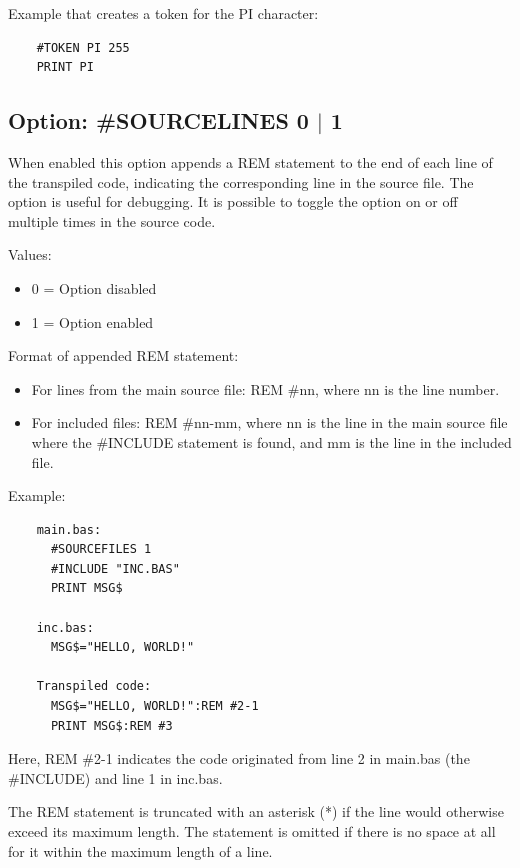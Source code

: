 \documentclass{article}
\begin{document}
        Example that creates a token for the PI character:

        \begin{verbatim}
    #TOKEN PI 255
    PRINT PI
         \end{verbatim}

    \subsection{Option: \#SOURCELINES 0 $|$ 1}
        When enabled this option appends a REM statement to the end of each line of the
        transpiled code, indicating the corresponding line in the source file. 
        The option is useful for debugging. It is possible to toggle the option on or off multiple times 
        in the source code.

        Values:
        \begin{itemize}
            \item 0 = Option disabled
            \item 1 = Option enabled
        \end{itemize}

        Format of appended REM statement:
        \begin{itemize}
            \item For lines from the main source file: REM \#nn, where nn is the line number.
            \item For included files: REM \#nn-mm, where nn is the line in the main source file
            where the \#INCLUDE statement is found, and mm is the line in the included file.
        \end{itemize}

        Example:
        \begin{verbatim}
    main.bas:
      #SOURCEFILES 1
      #INCLUDE "INC.BAS"
      PRINT MSG$

    inc.bas:
      MSG$="HELLO, WORLD!"
    
    Transpiled code:
      MSG$="HELLO, WORLD!":REM #2-1
      PRINT MSG$:REM #3
         \end{verbatim}
    
        Here, REM \#2-1 indicates the code originated from line 2 in main.bas (the \#INCLUDE)
        and line 1 in inc.bas.

        The REM statement is truncated with an asterisk (*) if the line would otherwise
        exceed its maximum length. The statement is omitted if there is no space at all
        for it within the maximum length of a line.
\end{document}

